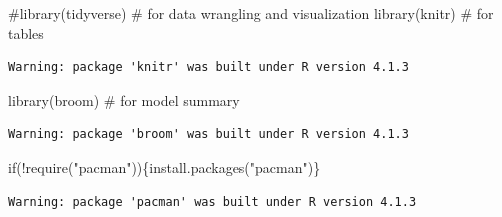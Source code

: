 \documentclass[
  letterpaper,
  DIV=11,
  numbers=noendperiod]{scrartcl}
\newenvironment{Shaded}{\begin{snugshade}}{\end{snugshade}}
\newcommand{\CommentTok}[1]{\textcolor[rgb]{0.37,0.37,0.37}{#1}}
\newcommand{\ControlFlowTok}[1]{\textcolor[rgb]{0.00,0.23,0.31}{#1}}
\newcommand{\FunctionTok}[1]{\textcolor[rgb]{0.28,0.35,0.67}{#1}}
\newcommand{\NormalTok}[1]{\textcolor[rgb]{0.00,0.23,0.31}{#1}}
\newcommand{\SpecialCharTok}[1]{\textcolor[rgb]{0.37,0.37,0.37}{#1}}
\newcommand{\StringTok}[1]{\textcolor[rgb]{0.13,0.47,0.30}{#1}}
\begin{document}
\begin{Shaded}
\begin{Highlighting}[]
\CommentTok{\#library(tidyverse)  \# for data wrangling and visualization}
\FunctionTok{library}\NormalTok{(knitr)      }\CommentTok{\# for tables}
\end{Highlighting}
\end{Shaded}

\begin{verbatim}
Warning: package 'knitr' was built under R version 4.1.3
\end{verbatim}

\begin{Shaded}
\begin{Highlighting}[]
\FunctionTok{library}\NormalTok{(broom)      }\CommentTok{\# for model summary}
\end{Highlighting}
\end{Shaded}

\begin{verbatim}
Warning: package 'broom' was built under R version 4.1.3
\end{verbatim}

\begin{Shaded}
\begin{Highlighting}[]
\ControlFlowTok{if}\NormalTok{(}\SpecialCharTok{!}\FunctionTok{require}\NormalTok{(}\StringTok{"pacman"}\NormalTok{))\{}\FunctionTok{install.packages}\NormalTok{(}\StringTok{"pacman"}\NormalTok{)\}}
\end{Highlighting}
\end{Shaded}

\begin{verbatim}
Warning: package 'pacman' was built under R version 4.1.3
\end{verbatim}
\end{document}
